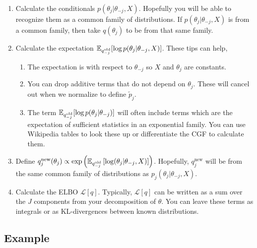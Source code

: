 \begin{enumerate}
    \item Calculate the conditionals $p(\theta_j  |  \theta_{-j},X)$. Hopefully you will be able to recognize them as a common family of distributions. If $p(\theta_j  |  \theta_{-j},X)$ is from a common family, then take $q(\theta_j)$ to be from that same family. 
    \item Calculate the expectation ${\mathbb E}_{q_{-j}^{\text{old}}}[\log p(\theta_j  |  \theta_{-j},X)]$. These tips can help,
    \begin{enumerate}
        \item The expectation is with respect to $\theta_{-j}$ so $X$ and $\theta_j$ are constants.
        \item You can drop additive terms that do not depend on $\theta_j$. These will cancel out when we normalize to define $\tilde{p}_j$.
        \item The term ${\mathbb E}_{q_{-j}^{\text{old}}}[\log p(\theta_j  |  \theta_{-j})]$ will often include terms which are the expectation of sufficient statistics in an exponential family. You can use Wikipedia tables to look these up or differentiate the CGF to calculate them.
    \end{enumerate}
    \item Define $q_j^\text{new}(\theta_j) \propto \exp\left({\mathbb E}_{q_{-j}^{\text{old}}}\left[\log (\theta_j  |  \theta_{-j},X)\right]\right)$. Hopefully, $q_j^\text{new}$ will be from the same common family of distributions as $p_j(\theta_j  |  \theta_{-j},X)$.
    \item Calculate the ELBO $\mathcal{L}[q]$. Typically, $\mathcal{L}[q]$ can be written as a sum over the $J$ components from your decomposition of $\theta$. You can leave these terms as integrals or as KL-divergences between known distributions.
\end{enumerate}

\subsection{Example}

